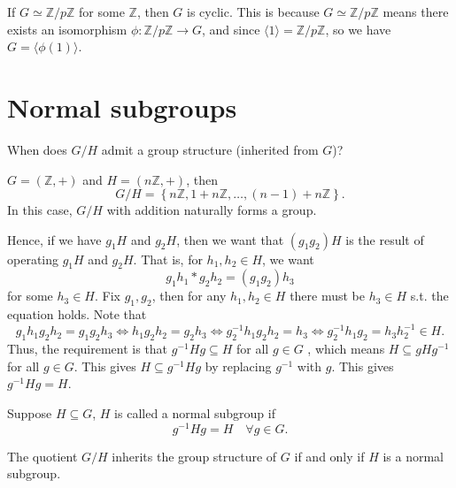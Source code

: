 \begin{note}
    If \(G \simeq \mathbb{Z} / p \mathbb{Z} \) for some \(\mathbb{Z} \), then \(G\) is cyclic. This is because \(G \simeq \mathbb{Z} / p \mathbb{Z} \) means there exists an isomorphism \(\phi : \mathbb{Z} / p \mathbb{Z} \to G\), and since \(\langle 1 \rangle = \mathbb{Z} / p \mathbb{Z} \), so we have \(G = \langle \phi(1) \rangle \).   
\end{note}

\section{Normal subgroups}
\begin{question}
    When does \(G / H\) admit a group structure (inherited from \(G\))?
\end{question}

\begin{eg}
    \(G = (\mathbb{Z} , +)\) and \(H = (n\mathbb{Z} , +)\), then 
    \[
        G / H = \left\{ n\mathbb{Z} , 1 + n\mathbb{Z} , \dots , (n - 1) + n\mathbb{Z}  \right\}. 
    \]  
    In this case, \(G / H\) with addition naturally forms a group. 
\end{eg}

Hence, if we have \(g_1 H\) and \(g_2 H\), then we want that \((g_1 g_2) H\) is the result of operating \(g_1 H\) and \(g_2 H\). That is, for \(h_1, h_2 \in H\), we want 
\[
    g_1 h_1 * g_2 h_2 = (g_1 g_2) h_3
\] for some \(h_3 \in H\). Fix \(g_1, g_2\), then for any \(h_1, h_2 \in H\) there must be  \(h_3 \in H\) s.t. the equation holds. Note that 
\[
    g_1 h_1 g_2 h_2 = g_1 g_2 h_3 \iff  h_1 g_2 h_2 = g_2 h_3 \iff  g_2^{-1} h_1 g_2 h_2 = h_3 \iff g_2^{-1} h_1 g_2 = h_3 h_2^{-1} \in H.
\] Thus, the requirement is that \(g^{-1} H g \subseteq H\) for all \(g \in G\) , which means \(H \subseteq gHg^{-1} \) for all \(g \in G\). This gives \(H \subseteq g^{-1} H g\) by replacing \(g^{-1} \) with \(g\). This gives \(g^{-1} H g = H\). 

\begin{definition}
    Suppose \(H \subseteq G\), \(H\) is called a normal subgroup if 
    \[
        g^{-1} H g = H \quad \forall g \in G.
    \]
\end{definition}

\begin{theorem} \label{thm: G/H group iff H nomral}
    The quotient \(G / H\) inherits the group structure of \(G\) if and only if \(H\) is a normal subgroup.   
\end{theorem}


